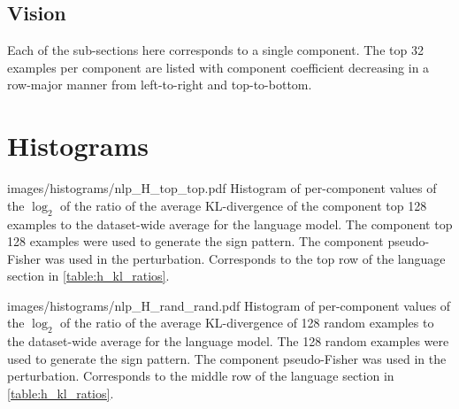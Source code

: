\documentclass[dvipsnames]{article}
\begin{document}


\subsection{Vision}
Each of the sub-sections here corresponds to a single component.
The top 32 examples per component are listed with component coefficient decreasing in a row-major manner from left-to-right and top-to-bottom.










\section{Histograms}\label{sec:histograms}




\appendixhistogram
{images/histograms/nlp_H_top_top.pdf}
{Histogram of per-component values of the $\log_2$ of the ratio of the average KL-divergence of the component top 128 examples to the dataset-wide average for the language model.
The component top 128 examples were used to generate the sign pattern.
The component pseudo-Fisher was used in the perturbation.
Corresponds to the top row of the language section in \cref{table:h_kl_ratios}.}

\appendixhistogram
{images/histograms/nlp_H_rand_rand.pdf}
{Histogram of per-component values of the $\log_2$ of the ratio of the average KL-divergence of 128 random examples to the dataset-wide average for the language model.
The 128 random examples were used to generate the sign pattern.
The component pseudo-Fisher was used in the perturbation.
Corresponds to the middle row of the language section in \cref{table:h_kl_ratios}.}
\end{document}
